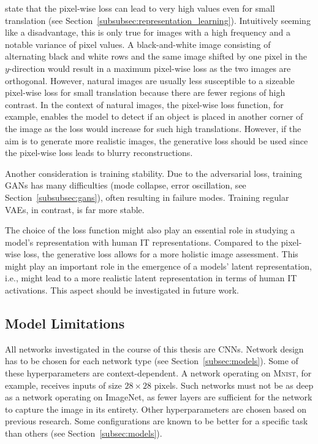 \citet{larsen2015autoencoding} state that the pixel-wise loss can lead to very high values even for small translation (see Section~\ref{subsubsec:representation_learning}).
Intuitively seeming like a disadvantage, this is only true for images with a high frequency and a notable variance of pixel values.
A black-and-white image consisting of alternating black and white rows and the same image shifted by one pixel in the $y$-direction would result in a maximum pixel-wise loss as the two images are orthogonal.
However, natural images are usually less susceptible to a sizeable pixel-wise loss for small translation because there are fewer regions of high contrast.
In the context of natural images, the pixel-wise loss function, for example, enables the model to detect if an object is placed in another corner of the image as the loss would increase for such high translations.
However, if the aim is to generate more realistic images, the generative loss should be used since the pixel-wise loss leads to blurry reconstructions.

Another consideration is training stability.
Due to the adversarial loss, training \acp{GAN} has many difficulties (mode collapse, error oscillation, see Section~\ref{subsubsec:gans}), often resulting in failure modes.
Training regular \acp{VAE}, in contrast, is far more stable.

The choice of the loss function might also play an essential role in studying a model's representation with human \ac{IT} representations.
Compared to the pixel-wise loss, the generative loss allows for a more holistic image assessment.
This might play an important role in the emergence of a models' latent representation, i.e., might lead to a more realistic latent representation in terms of human IT activations.
This aspect should be investigated in future work.

\subsection{Model Limitations}\label{subsec:model-limitations}
All networks investigated in the course of this thesis are \acp{CNN}.
Network design has to be chosen for each network type (see Section~\ref{subsec:models}).
Some of these hyperparameters are context-dependent.
A network operating on \textsc{Mnist}, for example, receives inputs of size $28\times 28$ pixels.
Such networks must not be as deep as a network operating on ImageNet, as fewer layers are sufficient for the network to capture the image in its entirety.
Other hyperparameters are chosen based on previous research.
Some configurations are known to be better for a specific task than others (see Section~\ref{subsec:models}).

